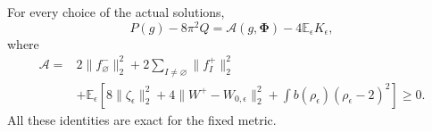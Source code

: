 \begin{proposition}
\label{webvar:simultaneous-cost}
For every choice of the actual solutions,
\begin{equation}\label{webvar:field-cost}
 P(g)-8\pi^2Q=\mathscr A(g,\boldsymbol\Phi)
                         -4\mathbb E_\epsilon K_\epsilon,
\end{equation}
where
\begin{equation}\label{webvar:positive-field-cost}
 \begin{split}
 \mathscr A={}&2\|f_\varnothing^-\|_2^2
                 +2\sum_{I\ne\varnothing}\|f_I^+\|_2^2\\
 &+\mathbb E_\epsilon\left[
 8\|\zeta_\epsilon\|_2^2+4\|W^+-W_{0,\epsilon}\|_2^2
       +\int b(\rho_\epsilon)(\rho_\epsilon-2)^2\right]\ge0.
 \end{split}
\end{equation}
All these identities are exact for the fixed metric.
\end{proposition}
